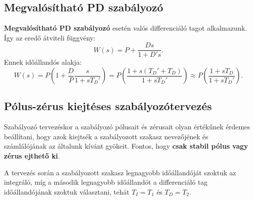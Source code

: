 \subsection{Megvalósítható PD szabályozó}

\textbf{Megvalósítható PD szabályozó} esetén valós differenciáló tagot
alkalmazunk. Így az eredő átviteli függvény:
\begin{equation}
  W(s)
  = P + \frac{Ds}{1 + D's}
  .
  \label{eq:PD-real-base}
\end{equation}
Ennek időállandós alakja:
\begin{equation}
  W(s)
  = P \left( 1 + \frac{D}{P} \frac{s}{1 + sT_D'} \right)
  = P \left( \frac{1 + s(T_D' + T_D)}{1 + sT_D'} \right)
  \approx P \left( \frac{1 + sT_D}{1 + sT_D'} \right)
  .
  \label{eq:PD-real-time}
\end{equation}

\subsection{Pólus-zérus kiejtéses szabályozótervezés}

Szabályozó tervezéskor a szabályozó pólusait és zérusait olyan értékűnek
érdemes beállítani, hogy azok kiejtsék a szabályozott szakasz nevezőjének
és számlálójának az általunk kívánt gyökeit. Fontos, hogy \textbf{csak stabil
  pólus vagy zérus ejthető ki}.

A tervezés során a szabályozott szakasz legnagyobb időállandóját szoktuk az
integráló, míg a második legnagyobb időállandót a differenciáló tag
időállandójának szoktuk választani, tehát $T_I = T_1$ és $T_D = T_2$.

